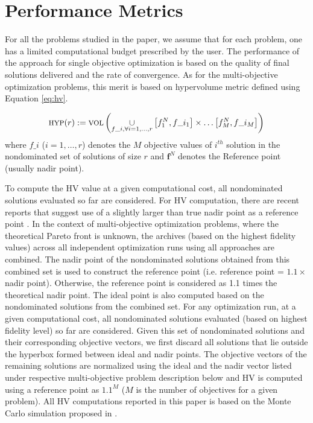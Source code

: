 \section{Performance Metrics}
For all the problems studied in the paper, we assume that for each problem, one has a limited computational budget prescribed by the user. The performance of the approach for single objective optimization is based on the quality of final solutions delivered and the rate of convergence. As for the multi-objective optimization problems, this merit is based on hypervolume metric defined  using Equation \ref{eq:hv}.

\begin{equation}\footnotesize
\text{HYP}(r) := \text{VOL}\left(\underset{f\_i,\forall i = 1,\ldots,r} \cup \left[f^{N}_1,f\_i_{1}\right]\times\ldots\left[f^{N}_{M},f\_i_{M}\right]\right)
\label{eq:hv}
\end{equation}
where $f\_i$ ($i = 1,\dots,r$) denotes the $M$ objective values of $i^{th}$ solution in the nondominated set of solutions of size $r$ and $\textbf{f}^{N}$ denotes the Reference point (usually nadir point). 

To compute the HV value at a given computational cost, all nondominated solutions evaluated so far are considered.  For HV computation, there are recent reports that suggest use of a slightly larger than true nadir point as a reference point \cite{auger2009theory,Yuan2016many,ishibuchi2010many}. In the context of multi-objective optimization problems, where the theoretical Pareto front is unknown, the archives (based on the highest fidelity values) across all independent optimization runs using all approaches are combined. The nadir point of the nondominated solutions obtained from this combined set is used to construct the reference point (i.e. reference point = $1.1\times$nadir point). Otherwise, the reference point is considered as 1.1 times the theoretical nadir point. The ideal point is also computed based on the nondominated solutions from the combined set. For any optimization run, at a given computational cost, all nondominated solutions evaluated (based on highest fidelity level) so far are considered. Given this set of nondominated solutions and their corresponding objective vectors, we first discard all solutions that lie outside the hyperbox formed between ideal and nadir points. The objective vectors of the remaining solutions are normalized using the ideal and the nadir vector listed under respective multi-objective problem description below and HV is computed using a reference point as $1.1^M$ ($M$ is the number of objectives for a given problem). All HV computations reported in this paper is based on the Monte Carlo simulation proposed in \cite{bader2011hype}.

